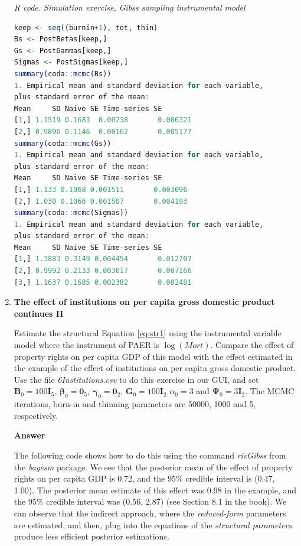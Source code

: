 \begin{enumerate}[leftmargin=*]
\begin{tcolorbox}[enhanced,width=4.67in,center upper,
	fontupper=\large\bfseries,drop shadow southwest,sharp corners]
	\textit{R code. Simulation exercise, Gibss sampling instrumental model}
	\begin{VF}
		\begin{lstlisting}[language=R]
keep <- seq((burnin+1), tot, thin)
Bs <- PostBetas[keep,]
Gs <- PostGammas[keep,]
Sigmas <- PostSigmas[keep,]
summary(coda::mcmc(Bs))
1. Empirical mean and standard deviation for each variable,
plus standard error of the mean:
Mean     SD Naive SE Time-series SE
[1,] 1.1519 0.1683  0.00238       0.006321
[2,] 0.9896 0.1146  0.00162       0.005177
summary(coda::mcmc(Gs))
1. Empirical mean and standard deviation for each variable,
plus standard error of the mean:
Mean     SD Naive SE Time-series SE
[1,] 1.133 0.1068 0.001511       0.003096
[2,] 1.030 0.1066 0.001507       0.004193
summary(coda::mcmc(Sigmas))
1. Empirical mean and standard deviation for each variable,
plus standard error of the mean:
Mean     SD Naive SE Time-series SE
[1,] 1.3883 0.3149 0.004454       0.012707
[2,] 0.9992 0.2133 0.003017       0.007166
[3,] 1.1637 0.1685 0.002382       0.002481
\end{lstlisting}
	\end{VF}
\end{tcolorbox}

\item \textbf{The effect of institutions on per capita gross domestic product continues II}

Estimate the structural Equation \ref{eq:str1} using the instrumental variable model where the instrument of PAER is $\log(\textit{Mort})$. Compare the effect of property rights on per capita GDP of this model with the effect estimated in the example of the effect of institutions on per capita gross domestic product. Use the file \textit{6Institutions.csv} to do this exercise in our GUI, and set $\bm{B}_0=100\bm{I}_5$, $\bm{\beta}_0=\bm{0}_5$, $\bm{\gamma}_0=\bm{0}_2$, $\bm{G}_0=100\bm{I}_2$ $\alpha_0=3$ and $\bm{\Psi}_0=3\bm{I}_2$. The MCMC iterations, burn-in and thinning parameters are 50000, 1000 and 5, respectively. 

\textbf{Answer}

The following code shows how to do this using the command \textit{rivGibss} from the \textit{bayesm} package. We see that the posterior mean of the effect of property rights on per capita GDP is 0.72, and the 95\% credible interval is (0.47, 1.00). The posterior mean estimate of this effect was 0.98 in the example, and the 95\% credible interval was (0.56, 2.87) (see Section 8.1 in the book). We can observe that the indirect approach, where the \textit{reduced-form} parameters are estimated, and then, plug into the equations of the \textit{structural parameters} produce less efficient posterior estimations. 


\end{enumerate}
